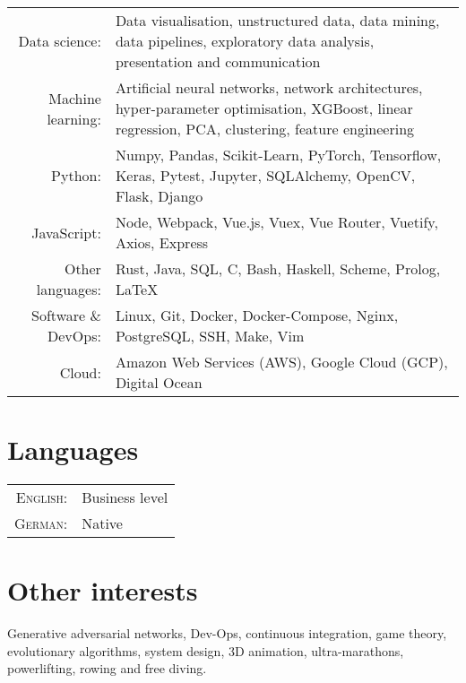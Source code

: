 \documentclass[11pt]{article}
\begin{document}
\begin{tabular}{ r p{} }

    Data science: & Data visualisation, unstructured data, data mining, data
    pipelines, exploratory data analysis, presentation and communication \\

    Machine learning: & Artificial neural networks, network architectures,
    hyper-parameter optimisation, XGBoost, linear regression, PCA, clustering,
    feature engineering \\

    Python: & Numpy, Pandas, Scikit-Learn, PyTorch, Tensorflow, Keras, Pytest,
    Jupyter, SQLAlchemy, OpenCV, Flask, Django \\

    JavaScript: & Node, Webpack, Vue.js, Vuex, Vue Router, Vuetify, Axios,
    Express \\

    Other languages: & Rust, Java, SQL, C, Bash, Haskell, Scheme, Prolog,
    \LaTeX \\

    Software \& DevOps: & Linux, Git, Docker, Docker-Compose, Nginx,
    PostgreSQL, SSH, Make, Vim \\

    Cloud: & Amazon Web Services (AWS), Google Cloud (GCP), Digital Ocean \\

\end{tabular}

\section{Languages}
\begin{tabular}{rl}
    \textsc{English:} & Business level \\
    \textsc{German:}  & Native \\
\end{tabular}

\section{Other interests}

Generative adversarial networks, Dev-Ops, continuous integration, game theory,
evolutionary algorithms, system design, 3D animation, ultra-marathons,
powerlifting, rowing and free diving.
\end{document}

